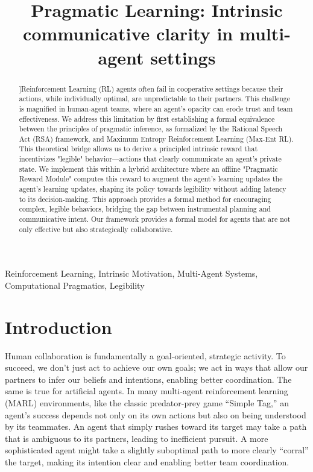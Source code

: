 \documentclass{article}
\title{Pragmatic Learning: Intrinsic communicative clarity in multi-agent settings}
\begin{document}
%
\maketitle
%
\begin{abstract}
]Reinforcement Learning (RL) agents often fail in cooperative settings because their actions, while individually optimal, are unpredictable to their partners. This challenge is magnified in human-agent teams, where an agent's opacity can erode trust and team effectiveness. We address this limitation by first establishing a formal equivalence between the principles of pragmatic inference, as formalized by the Rational Speech Act (RSA) framework, and Maximum Entropy Reinforcement Learning (Max-Ent RL). This theoretical bridge allows us to derive a principled intrinsic reward that incentivizes "legible" behavior—actions that clearly communicate an agent's private state. We implement this within a hybrid architecture where an offline "Pragmatic Reward Module" computes this reward to augment the agent's learning updates the agent's learning updates, shaping its policy towards legibility without adding latency to its decision-making. This approach provides a formal method for encouraging complex, legible behaviors, bridging the gap between instrumental planning and communicative intent. Our framework provides a formal model for agents that are not only effective but also strategically collaborative.
\end{abstract}
%
\begin{keywords}
Reinforcement Learning, Intrinsic Motivation, Multi-Agent Systems, Computational Pragmatics, Legibility
\end{keywords}
%
\section{Introduction}
\label{sec:intro}

Human collaboration is fundamentally a goal-oriented, strategic activity. To succeed, we don't just act to achieve our own goals; we act in ways that allow our partners to infer our beliefs and intentions, enabling better coordination. The same is true for artificial agents. In many multi-agent reinforcement learning (MARL) environments, like the classic predator-prey game ``Simple Tag,'' an agent's success depends not only on its own actions but also on being understood by its teammates. An agent that simply rushes toward its target may take a path that is ambiguous to its partners, leading to inefficient pursuit. A more sophisticated agent might take a slightly suboptimal path to more clearly ``corral'' the target, making its intention clear and enabling better team coordination.
\end{document}
